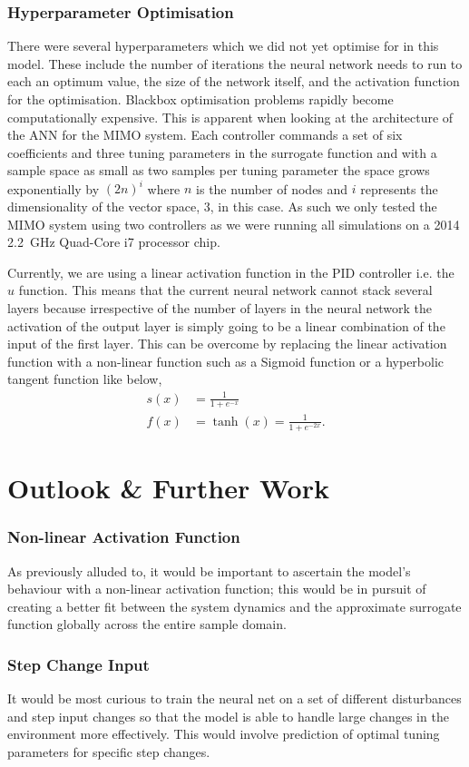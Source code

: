 \documentclass[conference]{IEEEtran}
\theoremstyle{definition}
\begin{document}
\subsubsection{Hyperparameter Optimisation}
There were several hyperparameters which we did not yet optimise for in this model. These include the number of iterations the neural network needs to run to each an optimum value, the size of the network itself, and the activation function for the optimisation. Blackbox optimisation problems rapidly become computationally expensive. This is apparent when looking at the architecture of the ANN for the MIMO system. Each controller commands a set of six coefficients and three tuning parameters in the surrogate function and with a sample space as small as two samples per tuning parameter the space grows exponentially by $(2n)^i$ where $n$ is the number of nodes and $i$ represents the dimensionality of the vector space, 3, in this case. As such we only tested the MIMO system using two controllers as we were running all simulations on a 2014 \SI{2.2}{GHz} Quad-Core i7 processor chip. 

Currently, we are using a linear activation function in the PID controller i.e. the $u$ function. This means that the current neural network cannot stack several layers because irrespective of the number of layers in the neural network the activation of the output layer is simply going to be a linear combination of the input of the first layer. This can be overcome by replacing the linear activation function with a non-linear function such as a Sigmoid function or a hyperbolic tangent function like below, 
\begin{align}
    s(x) &= \frac{1}{1 + e^{-x}} \\
    f(x) &= \tanh(x) = \frac{1}{1+e^{-2x}}.
    \end{align}
\section{Outlook \& Further Work}
\subsubsection{Non-linear Activation Function}
\noindent As previously alluded to, it would be important to ascertain the model's behaviour with a non-linear activation function; this would be in pursuit of creating a better fit between the system dynamics and the approximate surrogate function globally across the entire sample domain.
\subsubsection{Step Change Input}
\noindent It would be most curious to train the neural net on a set of different disturbances and step input changes so that the model is able to handle large changes in the environment more effectively. This would involve prediction of optimal tuning parameters for specific step changes. 
\end{document}
